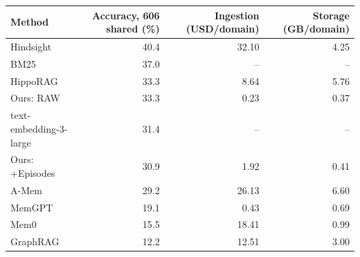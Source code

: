 \begin{tabular}{lrrr}
\toprule
Method & Accuracy, 606 shared (\%) & Ingestion (USD/domain) & Storage (GB/domain) \\
\midrule
Hindsight & 40.4 & 32.10 & 4.25 \\
BM25 & 37.0 & -- & -- \\
HippoRAG & 33.3 & 8.64 & 5.76 \\
Ours: RAW & 33.3 & 0.23 & 0.37 \\
text-embedding-3-large & 31.4 & -- & -- \\
Ours: +Episodes & 30.9 & 1.92 & 0.41 \\
A-Mem & 29.2 & 26.13 & 6.60 \\
MemGPT & 19.1 & 0.43 & 0.69 \\
Mem0 & 15.5 & 18.41 & 0.99 \\
GraphRAG & 12.2 & 12.51 & 3.00 \\
\bottomrule
\end{tabular}
